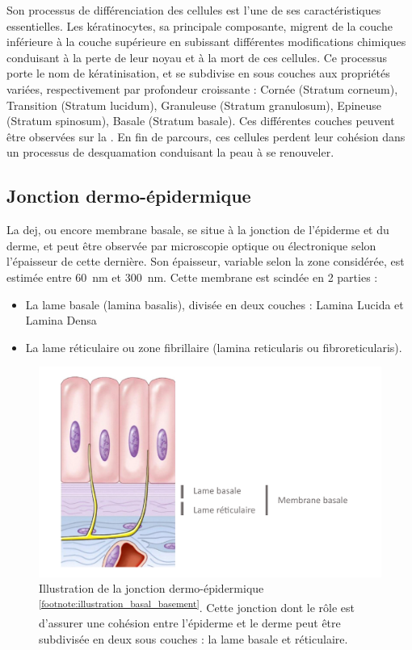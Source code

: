 Son processus de différenciation des cellules est l’une de ses caractéristiques essentielles. Les kératinocytes, sa principale composante, migrent de la couche inférieure à la couche supérieure en subissant différentes modifications chimiques conduisant à la perte de leur noyau et à la mort de ces cellules. Ce processus porte le nom de kératinisation, et se subdivise en sous couches aux propriétés variées, respectivement par profondeur croissante : Cornée (Stratum corneum), Transition (Stratum lucidum), Granuleuse (Stratum granulosum), Epineuse (Stratum spinosum), Basale (Stratum basale). Ces différentes couches peuvent être observées sur la . En fin de parcours, ces cellules perdent leur cohésion dans un processus de desquamation conduisant la peau à se renouveler.\par\clearpage

\subsection{Jonction dermo-épidermique}
La \gls{dej}, ou encore membrane basale, se situe à la jonction de l’épiderme et du derme, et peut être observée par microscopie optique ou électronique selon l’épaisseur de cette dernière. Son épaisseur, variable selon la zone considérée, est estimée entre \SI{60}{\nano\metre} et \SI{300}{\nano\metre}. 
Cette membrane est scindée en 2 parties :
\begin{itemize}
\item La lame basale (lamina basalis), divisée en deux couches : Lamina Lucida et Lamina Densa
\item La lame réticulaire ou zone fibrillaire (lamina reticularis ou fibroreticularis).
\end{itemize}\par
\begin{figure}[H]
    \centering
    \includegraphics[width=\linewidth]{contents/chapter_1/resources/illustration_basal_basement.pdf}
    \caption{Illustration de la jonction dermo-épidermique \textsuperscript{\ref{footnote:illustration_basal_basement}}. Cette jonction dont le rôle est d'assurer une cohésion entre l'épiderme et le derme peut être subdivisée en deux sous couches : la lame basale et réticulaire. }
    \label{fig:illustration_basal_basement}
\end{figure}\par

